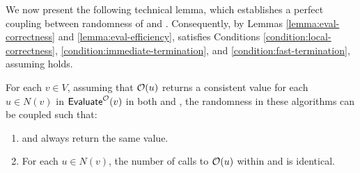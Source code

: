 We now present the following technical lemma, which establishes a perfect coupling between randomness of  and . Consequently, by Lemmas \ref{lemma:eval-correctness} and \ref{lemma:eval-efficiency},  satisfies Conditions \ref{condition:local-correctness}, \ref{condition:immediate-termination}, and \ref{condition:fast-termination}, assuming  holds. %

\begin{lemma}\label{lemma:eval-efficient-coupling}
For each $v\in V$, assuming that $\mathcal{O}(u)$ returns a consistent value for each $u\in N(v)$ in $\textnormal{\textsf{Evaluate}}^{\mathcal{O}}(v)$ 
in both  and , 
the randomness in these algorithms can be coupled such that:
\begin{enumerate}
    \item {} and  always return the same value.
    \item For each $u\in N(v)$, the number of calls to $\mathcal{O}(u)$ within  and  is identical.
\end{enumerate}
\end{lemma}



